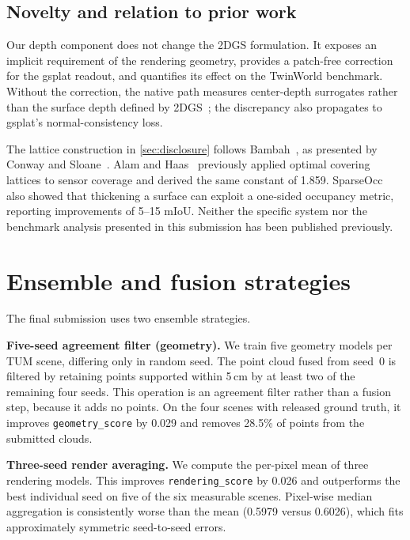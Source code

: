 \documentclass[10pt,twocolumn,letterpaper]{article}
\newcommand{\code}[1]{\texttt{\small #1}}
\begin{document}
\subsection{Novelty and relation to prior work}
\label{sec:novelty}

Our depth component does not change the 2DGS formulation. It exposes an implicit
requirement of the rendering geometry, provides a patch-free correction for the
gsplat readout, and quantifies its effect on the TwinWorld benchmark. Without
the correction, the native path measures center-depth surrogates rather than the
surface depth defined by 2DGS~\cite{huang2024_2dgs}; the discrepancy also
propagates to gsplat's normal-consistency loss.

The lattice construction in \cref{sec:disclosure} follows
Bambah~\cite{bambah1954}, as presented by Conway and
Sloane~\cite{conway1999sphere}. Alam and Haas~\cite{alam2006coverage} previously
applied optimal covering lattices to sensor coverage and derived the same
constant of 1.859. SparseOcc~\cite{liu2024sparseocc} also showed that thickening
a surface can exploit a one-sided occupancy metric, reporting improvements of
5--15 mIoU. Neither the specific system nor the benchmark analysis
presented in this submission has been published previously.

\section{Ensemble and fusion strategies}

The final submission uses two ensemble strategies.

\textbf{Five-seed agreement filter (geometry).} We train five geometry models
per TUM scene, differing only in random seed. The point cloud fused from seed~0
is filtered by retaining points supported within 5\,cm by at least two of the
remaining four seeds. This operation is an agreement filter rather than a fusion
step, because it adds no points. On the four scenes with released ground truth,
it improves \code{geometry\_score} by 0.029 and removes 28.5\% of points from the
submitted clouds.

\textbf{Three-seed render averaging.} We compute the per-pixel mean of three
rendering models. This improves \code{rendering\_score} by 0.026 and outperforms
the best individual seed on five of the six measurable scenes. Pixel-wise median
aggregation is consistently worse than the mean (0.5979 versus 0.6026), which
fits approximately symmetric seed-to-seed errors.
\end{document}
